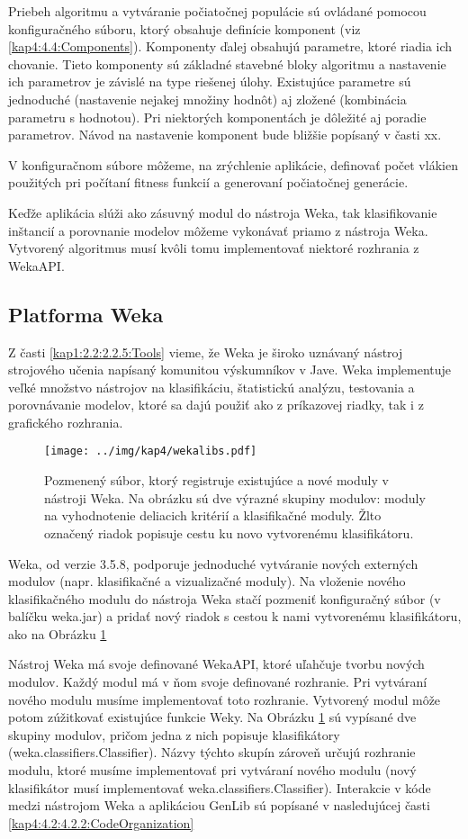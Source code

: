 Priebeh algoritmu a vytváranie počiatočnej populácie sú ovládané pomocou konfiguračného súboru, ktorý obsahuje definície komponent (viz \ref{kap4:4.4:Components}). Komponenty ďalej obsahujú parametre, ktoré riadia ich chovanie. Tieto komponenty sú základné stavebné bloky algoritmu a nastavenie ich parametrov je závislé na type riešenej úlohy. Existujúce parametre sú jednoduché (nastavenie nejakej množiny hodnôt) aj zložené (kombinácia parametru s hodnotou). Pri niektorých komponentách je dôležité aj poradie parametrov. Návod na nastavenie komponent bude bližšie popísaný v časti xx.

V konfiguračnom súbore môžeme, na zrýchlenie aplikácie, definovať počet vlákien použitých pri počítaní fitness funkcií a generovaní počiatočnej generácie.

Keďže aplikácia slúži ako zásuvný modul do nástroja Weka, tak klasifikovanie inštancií a porovnanie modelov môžeme vykonávať priamo z nástroja Weka. Vytvorený algoritmus musí kvôli tomu implementovať niektoré rozhrania z WekaAPI.

\subsection{Platforma Weka}\label{kap4:4.2:4.2.1:Weka}
Z časti \ref{kap1:2.2:2.2.5:Tools} vieme, že Weka je široko uznávaný nástroj strojového učenia napísaný komunitou výskumníkov v Jave. Weka implementuje veľké množstvo nástrojov na klasifikáciu, štatistickú analýzu, testovania a porovnávanie modelov, ktoré sa dajú použiť ako z príkazovej riadky, tak i z grafického rozhrania. 

\begin{figure}[h]
\centering
\centerline{\mbox{\texttt{[image: ../img/kap4/wekalibs.pdf]}}}
\caption{Pozmenený súbor, ktorý registruje existujúce a nové moduly v nástroji Weka. Na obrázku sú dve výrazné skupiny modulov: moduly na vyhodnotenie deliacich kritérií a klasifikačné moduly. Žlto označený riadok popisuje cestu ku novo vytvorenému klasifikátoru.}\label{fig:wekalibs}
\end{figure}

Weka, od verzie 3.5.8, podporuje jednoduché vytváranie nových externých modulov (napr. klasifikačné a vizualizačné moduly). Na vloženie nového klasifikačného modulu do nástroja Weka stačí pozmeniť konfiguračný súbor (v balíčku weka.jar) a pridať nový riadok s cestou k nami vytvorenému klasifikátoru, ako na Obrázku \ref{fig:wekalibs}

Nástroj Weka má svoje definované WekaAPI, ktoré uľahčuje tvorbu nových modulov. Každý modul má v ňom svoje definované rozhranie. Pri vytváraní nového modulu musíme implementovať toto rozhranie. Vytvorený modul môže potom zúžitkovať existujúce funkcie Weky. Na Obrázku \ref{fig:wekalibs} sú vypísané dve skupiny modulov, pričom jedna z nich popisuje klasifikátory (weka.classifiers.Classifier). Názvy týchto skupín zároveň určujú rozhranie modulu, ktoré musíme implementovať pri vytváraní nového modulu (nový klasifikátor musí implementovať weka.classifiers.Classifier).
Interakcie v kóde medzi nástrojom Weka a aplikáciou GenLib sú popísané v nasledujúcej časti \ref{kap4:4.2:4.2.2:CodeOrganization}

